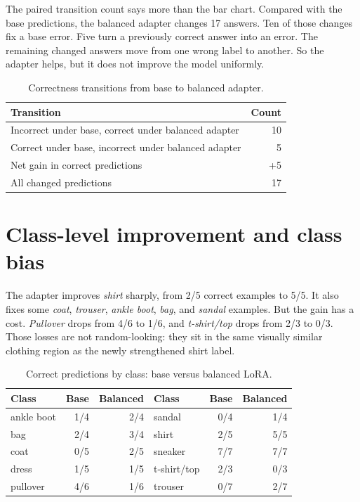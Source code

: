 \documentclass[11pt,a4paper]{report}
\begin{document}
The paired transition count says more than the bar chart.  Compared with the
base predictions, the balanced adapter changes 17 answers.  Ten of those
changes fix a base error.  Five turn a previously correct answer into an
error.  The remaining changed answers move from one wrong label to another.
So the adapter helps, but it does not improve the model uniformly.

\begin{table}[H]
\centering
\caption{Correctness transitions from base to balanced adapter.}
\begin{tabular}{lr}
\toprule
Transition & Count \\
\midrule
Incorrect under base, correct under balanced adapter & 10 \\
Correct under base, incorrect under balanced adapter & 5 \\
Net gain in correct predictions & +5 \\
All changed predictions & 17 \\
\bottomrule
\end{tabular}
\end{table}

\section{Class-level improvement and class bias}
The adapter improves \emph{shirt} sharply, from 2/5 correct examples to 5/5.
It also fixes some \emph{coat}, \emph{trouser}, \emph{ankle boot}, \emph{bag},
and \emph{sandal} examples.  But the gain has a cost.  \emph{Pullover} drops
from 4/6 to 1/6, and \emph{t-shirt/top} drops from 2/3 to 0/3.  Those losses
are not random-looking: they sit in the same visually similar clothing region
as the newly strengthened shirt label.

\begin{table}[H]
\centering
\caption{Correct predictions by class: base versus balanced LoRA.}
\begin{tabular}{lrr@{\hspace{7mm}}lrr}
\toprule
Class & Base & Balanced & Class & Base & Balanced \\
\midrule
ankle boot & 1/4 & 2/4 & sandal & 0/4 & 1/4 \\
bag & 2/4 & 3/4 & shirt & 2/5 & 5/5 \\
coat & 0/5 & 2/5 & sneaker & 7/7 & 7/7 \\
dress & 1/5 & 1/5 & t-shirt/top & 2/3 & 0/3 \\
pullover & 4/6 & 1/6 & trouser & 0/7 & 2/7 \\
\bottomrule
\end{tabular}
\end{table}
\end{document}
